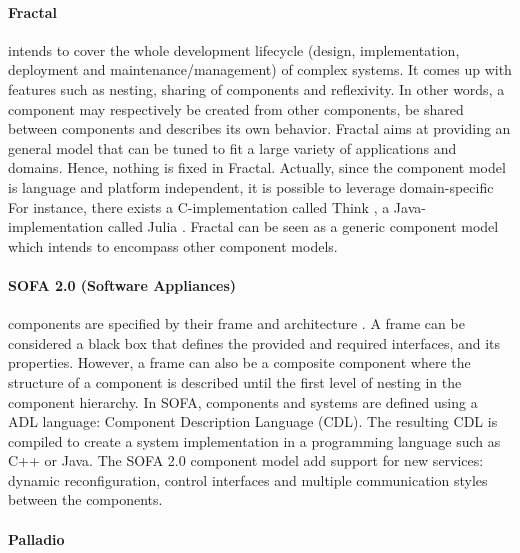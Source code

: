 \paragraph{Fractal} \cite{Bruneton:2006:FCM:1152333.1152345} intends to cover the whole development lifecycle (design, implementation, deployment and maintenance/management) of complex systems.
It comes up with features such as nesting, sharing of components and reflexivity.
In other words, a component may respectively be created from other components, be shared between components and describes its own behavior.
Fractal aims at providing an general model that can be tuned to fit a large variety of applications and domains.
Hence, nothing is fixed in Fractal.
Actually, since the component model is language and platform independent, it is possible to leverage domain-specific 
For instance, there exists a C-implementation called Think \cite{Fassino:2002:TSF:647057.713860}, 
a Java-implementation called Julia \cite{Bruneton:2006:FCM:1152333.1152345}.
Fractal can be seen as a generic component model which intends to encompass other component models.

\paragraph{SOFA 2.0 (Software Appliances)} components are specified by their frame and architecture \cite{Bures2006}.
A frame can be considered a black box that defines the provided and required interfaces, and its properties.
However, a frame can also be a composite component where the structure of a component is described until the first level of nesting in the component hierarchy.
In SOFA, components and systems are defined using a ADL language: Component Description Language (CDL).
The resulting CDL is compiled to create a system implementation in a programming
language such as C++ or Java.
The SOFA 2.0 component model add support for new services: dynamic reconfiguration, control interfaces and multiple communication styles between the components.

\paragraph{Palladio}


